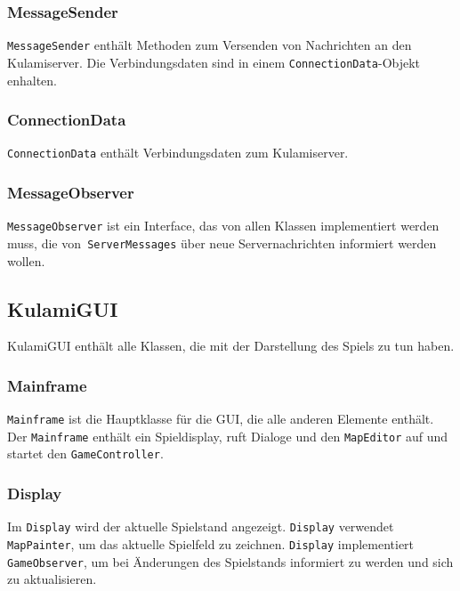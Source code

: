 \documentclass{scrartcl}
\begin{document}
\subsubsection{MessageSender}
\label{sec:MessageSender}

\texttt{MessageSender} enthält Methoden zum Versenden von Nachrichten an den Kulamiserver.  Die Verbindungsdaten sind in einem \texttt{ConnectionData}-Objekt enhalten.

\subsubsection{ConnectionData}
\label{sec:ConnectionData}

\texttt{ConnectionData} enthält Verbindungsdaten zum Kulamiserver.

\subsubsection{MessageObserver}
\label{sec:MessageObserver}

\texttt{MessageObserver} ist ein Interface, das von allen Klassen implementiert werden muss, die von\texttt{ ServerMessages} über neue Servernachrichten informiert werden wollen.

\subsection{KulamiGUI}
\label{sec:GUI}

KulamiGUI enthält alle Klassen, die mit der Darstellung des Spiels zu tun haben.

\subsubsection{Mainframe}
\label{sec:Mainframe}

\texttt{Mainframe} ist die Hauptklasse für die GUI, die alle anderen Elemente enthält.  Der \texttt{Mainframe} enthält ein Spieldisplay, ruft Dialoge und den \texttt{MapEditor} auf und startet den \texttt{GameController}.

\subsubsection{Display}
\label{sec:Display}

Im \texttt{Display} wird der aktuelle Spielstand angezeigt.  \texttt{Display} verwendet \texttt{MapPainter}, um das aktuelle Spielfeld zu zeichnen.  \texttt{Display} implementiert \texttt{GameObserver}, um bei Änderungen des Spielstands informiert zu werden und sich zu aktualisieren.
\end{document}
